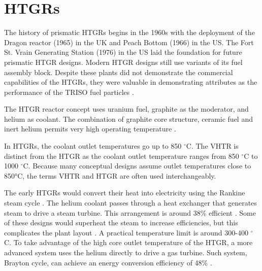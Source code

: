 \documentclass[11pt,letterpaper]{article}
\begin{document}

\section{\glspl{HTGR}}

The history of prismatic \glspl{HTGR} begins in the 1960s with the deployment of the Dragon reactor (1965) in the \gls{UK} and Peach Bottom (1966) in the \gls{US}\cite{huning_steady_2014}.
The Fort St. Vrain Generating Station (1976) in the \gls{US} laid the foundation for future prismatic \gls{HTGR} designs.
Modern \gls{HTGR} designs still use variants of its fuel assembly block.
Despite these plants did not demonstrate the commercial capabilities of the \glspl{HTGR}, they were  valuable in demonstrating attributes as the performance of the \gls{TRISO} fuel particles \cite{herranz_power_2009}.

The \gls{HTGR} reactor concept uses uranium fuel, graphite as the moderator, and helium as coolant\cite{breeze_nuclear_2014}.
The combination of graphite core structure, ceramic fuel and inert helium permits very high operating temperature \cite{ballinger_balance_2004}.

In \glspl{HTGR}, the coolant outlet temperatures go up to 850 $^{\circ}$C.
The \gls{VHTR} is distinct from the \gls{HTGR} as the coolant outlet temperature ranges from 850 $^{\circ}$C to 1000 $^{\circ}$C.
Because many conceptual designs assume outlet temperatures close to 850°C, the terms \gls{VHTR} and \gls{HTGR} are often used interchangeably\cite{huning_steady_2014}.

The early \glspl{HTGR} would convert their heat into electricity using the Rankine steam cycle \cite{herranz_power_2009}.
The helium coolant passes through a heat exchanger that generates steam to drive a steam turbine.
This arrangement is around 38\% efficient \cite{breeze_nuclear_2014}.
Some of these designs would superheat the steam to increase efficiencies, but this complicates the plant layout \cite{ballinger_balance_2004}.
A practical temperature limit is around 300-400 $^{\circ}$C.
To take advantage of the high core outlet temperature of the \gls{HTGR}, a more advanced system uses the helium directly to drive a gas turbine.
Such system, Brayton cycle, can achieve an energy conversion efficiency of 48\% \cite{breeze_nuclear_2014}.
\end{document}
